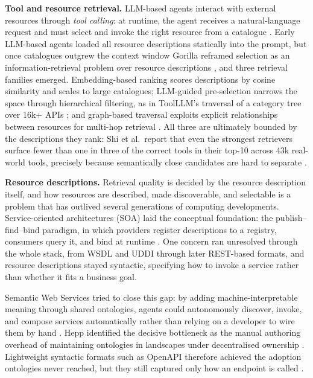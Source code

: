 \documentclass[10pt,twocolumn]{article}
\begin{document}
\textbf{Tool and resource retrieval.}
LLM-based agents interact with external resources through \emph{tool calling}: at runtime, the agent receives a natural-language request and must select and invoke the right resource from a catalogue \citep{schick_toolformer_2023,openai_function_calling_2023}. Early LLM-based agents loaded all resource descriptions statically into the prompt, but once catalogues outgrew the context window Gorilla reframed selection as an information-retrieval problem over resource descriptions \citep{gonzalez_gorilla_2024}, and three retrieval families emerged. Embedding-based ranking scores descriptions by cosine similarity and scales to large catalogues; LLM-guided pre-selection narrows the space through hierarchical filtering, as in ToolLLM's traversal of a category tree over 16k+ APIs \citep{qin_toolllm_nodate}; and graph-based traversal exploits explicit relationships between resources for multi-hop retrieval \citep{nizar_agent-as--graph_2026}. All three are ultimately bounded by the descriptions they rank: Shi et al.\ report that even the strongest retrievers surface fewer than one in three of the correct tools in their top-10 across 43k real-world tools, precisely because semantically close candidates are hard to separate \citep{shi_retrieval_2025}.

\textbf{Resource descriptions.}
Retrieval quality is decided by the resource description itself, and how resources are described, made discoverable, and selectable is a problem that has outlived several generations of computing developments. Service-oriented architectures (SOA) laid the conceptual foundation: the publish--find--bind paradigm, in which providers register descriptions to a registry, consumers query it, and bind at runtime \citep{melzer_service-orientierte_2010,curbera_unraveling_2002}. One concern ran unresolved through the whole stack, from WSDL and UDDI through later REST-based formats, and resource descriptions stayed syntactic, specifying how to invoke a service rather than whether it fits a business goal. 

Semantic Web Services tried to close this gap: by adding machine-interpretable meaning through shared ontologies, agents could autonomously discover, invoke, and compose services automatically rather than relying on a developer to wire them by hand \citep{mcilraith_semantic_2001,feier_towards_2005}. Hepp identified the decisive bottleneck as the manual authoring overhead of maintaining ontologies in landscapes under decentralised ownership \citep{hepp_ontology_2007}. Lightweight syntactic formats such as OpenAPI therefore achieved the adoption ontologies never reached, but they still captured only how an endpoint is called \citep{pautasso_restful_2008,mazzara_microservices_2017,schwichtenberg_open_2017}.
\end{document}

